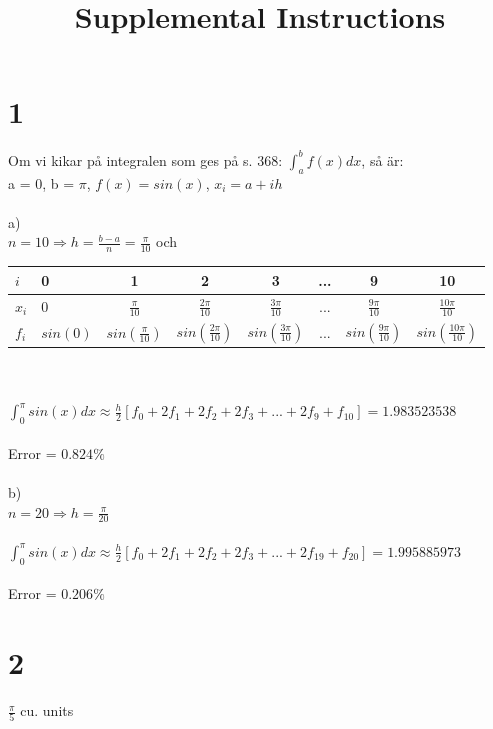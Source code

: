 \documentclass{article}
\title{Supplemental Instructions}
\date{
     }
\begin{document}
\maketitle


\section*{1}
Om vi kikar på integralen som ges på s. 368: $\int_a^b f(x) dx$, så är: \\
a = 0, b = $\pi$, $f(x) = sin(x)$, $x_i = a+ih$\\\\

\noindent
a) \\
\noindent
$n = 10 \Rightarrow h = \frac{b-a}{n} = \frac{\pi}{10}$ och 

\begin{tabular}{l|l*{6}{c}} \\
$i$     & 0 & 1 & 2 & 3 & ...  & 9 & 10 \\
\hline
$x_i$   & 0 & $\frac{\pi}{10}$ & $\frac{2 \pi}{10}$ & $\frac{3 \pi}{10}$ & 
        ... & $\frac{9 \pi}{10}$ & $\frac{10 \pi}{10}$  \\
        [5pt]
$f_i$   & $sin(0)$ & $sin(\frac{\pi}{10})$ & $sin(\frac{2 \pi}{10})$ & 
        $sin(\frac{3 \pi}{10})$ & ... & $sin(\frac{9 \pi}{10})$ & 
        $sin(\frac{10 \pi}{10})$ \\
\end{tabular}\\\\
[20pt]
$\int_0^{\pi} sin(x) dx \approx \frac{h}{2}[f_0 + 2f_1 + 2f_2 + 2f_3 + ... + 2f_9 + f_{10}]
 = 1.983 523 538$\\\\
Error = $0.824\%$\\\\
\noindent
b) \\
\noindent
$n = 20 \Rightarrow h = \frac{\pi}{20}$\\\\
$\int_0^{\pi} sin(x) dx \approx \frac{h}{2}[f_0 + 2f_1 + 2f_2 + 2f_3 + ... + 2f_{19} + f_{20}]
= 1.995 885 973$\\\\
Error = $0.206\%$


\section*{2}
$\frac{\pi}{5}$ cu. units
\end{document}
